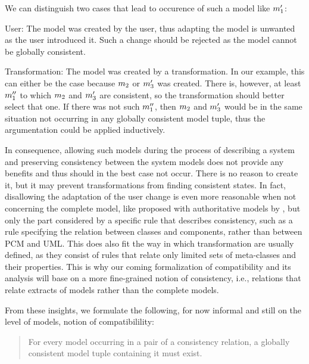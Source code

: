 We can distinguish two cases that lead to occurence of such a model like $m_{1}'$:
\begin{properdescription}
    \item[User:] The model was created by the user, thus adapting the model is unwanted as the user introduced it. Such a change should be rejected as the model cannot be globally consistent.
    \item[Transformation:] The model was created by a transformation. In our example, this can either be the case because $m_{2}$ or $m_{3}'$ was created. There is, however, at least $m_{1}''$ to which $m_{2}$ and $m_{3}'$ are consistent, so the transformation should better select that one. If there was not such $m_{1}''$, then $m_{2}$ and $m_{3}'$ would be in the same situation not occurring in any globally consistent model tuple, thus the argumentation could be applied inductively.
\end{properdescription}
In consequence, allowing such models during the process of describing a system and preserving consistency between the system models does not provide any benefits and thus should in the best case not occur.
There is no reason to create it, but it may prevent transformations from finding consistent states.
In fact, disallowing the adaptation of the user change is even more reasonable when not concerning the complete model, like proposed with authoritative models by \textcite{stevens2020BidirectionalTransformationLarge-SoSym}, but only the part considered by a specific rule that describes consistency, such as a rule specifying the relation between classes and components, rather than between \gls{PCM} and UML.
This does also fit the way in which transformation are usually defined, as they consist of rules that relate only limited sets of meta-classes and their properties.
This is why our coming formalization of compatibility and its analysis will base on a more fine-grained notion of consistency, i.e., relations that relate extracts of models rather than the complete models.

From these insights, we formulate the following, for now informal and still on the level of models, notion of compatibilility:
\begin{quote}
    For every model occurring in a pair of a consistency relation, a globally consistent model tuple containing it must exist.
\end{quote}

